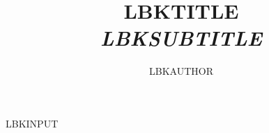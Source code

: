 \documentclass{book}
\title{\textbf{LBKTITLE}\\{\normalsize \textit{LBKSUBTITLE}}}
\author{LBKAUTHOR}
\begin{document}
\maketitle

LBKINPUT
\end{document}
